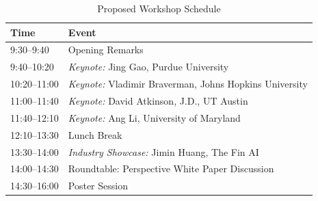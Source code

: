 \documentclass[conference]{IEEEtran}
\begin{document}
\begin{table}[h!]
\renewcommand{\arraystretch}{1.1}
\setlength{\tabcolsep}{6pt}
\centering
\caption{Proposed Workshop Schedule}
\begin{tabular}{@{}ll@{}}
\toprule
\textbf{Time}       & \textbf{Event} \\
\midrule
9:30--9:40   & Opening Remarks \\
9:40--10:20  & \textit{Keynote:} Jing Gao, Purdue University \\
10:20--11:00 & \textit{Keynote:} Vladimir Braverman, Johns Hopkins University \\
11:00--11:40 & \textit{Keynote:} David Atkinson, J.D., UT Austin \\
11:40--12:10 & \textit{Keynote:} Ang Li, University of Maryland \\
12:10--13:30 & Lunch Break \\
13:30--14:00 & \textit{Industry Showcase:} Jimin Huang, The Fin AI \\
14:00--14:30 & Roundtable: Perspective White Paper Discussion \\
14:30--16:00 & Poster Session \\
\bottomrule
\end{tabular}
\end{table}
\end{document}
